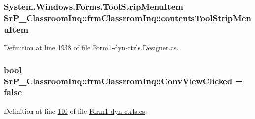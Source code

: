 \hypertarget{class_sr_p___classroom_inq_1_1frm_classrrom_inq_ac8e6b07efe8b6fe7e1a82d326648f88e}{
\subsubsection[{contents\-Tool\-Strip\-Menu\-Item}]{\setlength{\rightskip}{0pt plus 5cm}\-System.\-Windows.\-Forms.\-Tool\-Strip\-Menu\-Item {\bf \-Sr\-P\-\_\-\-Classroom\-Inq\-::frm\-Classrrom\-Inq\-::contents\-Tool\-Strip\-Menu\-Item}}}
\label{class_sr_p___classroom_inq_1_1frm_classrrom_inq_ac8e6b07efe8b6fe7e1a82d326648f88e}


\-Definition at line \hyperlink{_form1-dyn-ctrls_8_designer_8cs_source_l01938}{1938} of file \hyperlink{_form1-dyn-ctrls_8_designer_8cs_source}{\-Form1-\/dyn-\/ctrls.\-Designer.\-cs}.

\hypertarget{class_sr_p___classroom_inq_1_1frm_classrrom_inq_a567cf412a542927bb47984c0e835a7d2}{
\subsubsection[{\-Conv\-View\-Clicked}]{\setlength{\rightskip}{0pt plus 5cm}bool {\bf \-Sr\-P\-\_\-\-Classroom\-Inq\-::frm\-Classrrom\-Inq\-::\-Conv\-View\-Clicked} = false}}
\label{class_sr_p___classroom_inq_1_1frm_classrrom_inq_a567cf412a542927bb47984c0e835a7d2}


\-Definition at line \hyperlink{_form1-dyn-ctrls_8cs_source_l00110}{110} of file \hyperlink{_form1-dyn-ctrls_8cs_source}{\-Form1-\/dyn-\/ctrls.\-cs}.

